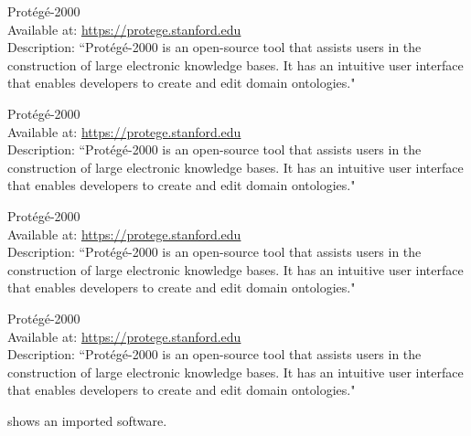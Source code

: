 \begin{software}
Prot{\'{e}}g{\'{e}}-2000~\cite{DBLP:conf/amia/NoyCFKTVM03}\\
Available at: \url{https://protege.stanford.edu}\\
Description: ``Prot\'{e}g\'{e}-2000 is an open-source tool that assists users in the construction of large electronic knowledge bases. It has an intuitive user interface that enables developers to create and edit domain ontologies."~\cite{DBLP:conf/amia/NoyCFKTVM03}
\label{software:protege16}
\end{software}
\begin{software}
Prot{\'{e}}g{\'{e}}-2000~\cite{DBLP:conf/amia/NoyCFKTVM03}\\
Available at: \url{https://protege.stanford.edu}\\
Description: ``Prot\'{e}g\'{e}-2000 is an open-source tool that assists users in the construction of large electronic knowledge bases. It has an intuitive user interface that enables developers to create and edit domain ontologies."~\cite{DBLP:conf/amia/NoyCFKTVM03}
\label{software:protege17}
\end{software}
\begin{software}
Prot{\'{e}}g{\'{e}}-2000~\cite{DBLP:conf/amia/NoyCFKTVM03}\\
Available at: \url{https://protege.stanford.edu}\\
Description: ``Prot\'{e}g\'{e}-2000 is an open-source tool that assists users in the construction of large electronic knowledge bases. It has an intuitive user interface that enables developers to create and edit domain ontologies."~\cite{DBLP:conf/amia/NoyCFKTVM03}
\label{software:protege18}
\end{software}
\begin{software}
Prot{\'{e}}g{\'{e}}-2000~\cite{DBLP:conf/amia/NoyCFKTVM03}\\
Available at: \url{https://protege.stanford.edu}\\
Description: ``Prot\'{e}g\'{e}-2000 is an open-source tool that assists users in the construction of large electronic knowledge bases. It has an intuitive user interface that enables developers to create and edit domain ontologies."~\cite{DBLP:conf/amia/NoyCFKTVM03}
\label{software:protege19}
\end{software}
 shows an imported software.


